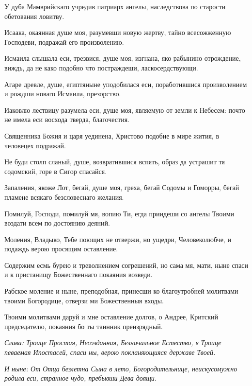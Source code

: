 У дуба Мамврийскаго учредив патриарх ангелы, наследствова по старости обетования ловитву.

Исаака, окаянная душе моя, разумевши новую жертву, тайно всесожженную Господеви, подражай его произволению.

Исмаила слышала еси, трезвися, душе моя, изгнана, яко рабынино отрождение, виждь, да не како подобно что постраждеши, ласкосердствующи.

Агаре древле, душе, египтяныне уподобилася еси, поработившися произволением и рождши новаго Исмаила, презорство.

Иаковлю лествицу разумела еси, душе моя, являемую от земли к Небесем: почто не имела еси восхода тверда, благочестия.

Священника Божия и царя уединена, Христово подобие в мире жития, в человецех подражай.

Не буди столп сланый, душе, возвратившися вспять, образ да устрашит тя содомский, горе в Сигор спасайся.

Запаления, якоже Лот, бегай, душе моя, греха, бегай Содомы и Гоморры, бегай пламене всякаго безсловеснаго желания.

Помилуй, Господи, помилуй мя, вопию Ти, егда приидеши со ангелы Твоими воздати всем по достоянию деяний.

Моления, Владыко, Тебе поющих не отвержи, но ущедри, Человеколюбче, и подаждь верою просящим оставление.


Содержим есмь бурею и треволнением согрешений, но сама мя, мати, ныне спаси и к пристанищу Божественнаго покаяния возведи.


Рабское моление и ныне, преподобная, принесши ко благоутробней молитвами твоими Богородице, отверзи ми Божественныя входы.


Твоими молитвами даруй и мне оставление долгов, о Андрее, Критский председателю, покаяния бо ты таинник преизрядный.

\itshape Слава\normalfont{}: Троице Простая, Несозданная, Безначальное Естество, в Троице певаемая Ипостасей, спаси ны, верою покланяющияся державе Твоей.

\itshape И ныне\normalfont{}: От Отца безлетна Сына в лето, Богородительнице, неискусомужно родила еси, странное чудо, пребывши Дева доящи.

